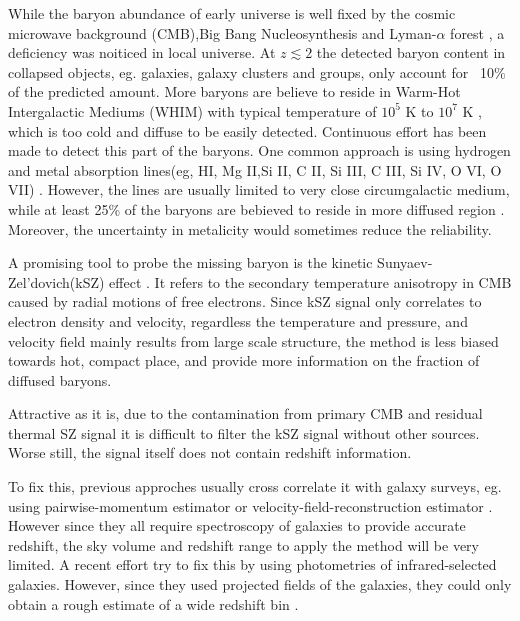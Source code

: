 While the baryon abundance of early universe is well fixed by the cosmic microwave background (CMB),Big Bang Nucleosynthesis and Lyman-$\alpha$ forest \cite{Cooke14}\cite{Fukugita98}\cite{Komatsu11}\cite{Hinshaw13}, 
a deficiency was noiticed in local universe.
At $z\lesssim 2$ the detected baryon content in collapsed
objects, eg. galaxies, galaxy clusters and groups, only account for ~10$\%$ of the predicted amount.
More baryons are believe to reside in Warm-Hot Intergalactic Mediums (WHIM) with typical temperature of $10^5$ K to $10^7$ K \cite{Soltan06}, which is too cold and diffuse to be easily detected.
Continuous effort has been made to detect this part of the baryons. 
One common approach is using hydrogen and metal absorption lines(eg, HI, Mg II,Si II, C II, Si III, C III, Si IV, O VI, O VII) \cite{Fukugita04}\cite{Werk14}.
However, the lines are usually limited to very close circumgalactic medium, while at least 25\% of the baryons are bebieved to reside in more diffused region \cite{Dave10}. Moreover, the uncertainty in metalicity would sometimes reduce the reliability.

A promising tool to probe the missing baryon is the kinetic Sunyaev-Zel'dovich(kSZ) effect \cite{Sunyaev72}\cite{Sunyaev80}. 
It refers to the secondary temperature anisotropy in CMB caused by radial motions of free electrons.
Since kSZ signal only correlates to electron density and velocity, 
regardless the temperature and pressure, 
and velocity field mainly results from large scale structure, 
the method is less biased towards hot, compact place, 
and provide more information on the fraction of diffused baryons.

Attractive as it is, 
due to the contamination from primary CMB and residual thermal SZ signal
it is difficult to filter the kSZ signal without other sources. 
Worse still, the signal itself does not contain redshift information.

To fix this, previous approches usually cross correlate it with galaxy surveys, 
eg. using pairwise-momentum estimator \cite{Hand12} or velocity-field-reconstruction estimator \cite{Shao11}\cite{Li14}. 
However since they all require spectroscopy of galaxies to provide accurate redshift, the sky volume and redshift range to apply the method will be very limited. 
A recent effort try to fix this by using photometries of infrared-selected galaxies. 
However, since they used projected fields of the galaxies, they could only obtain a rough estimate of a wide redshift bin \cite{Hill16}.

